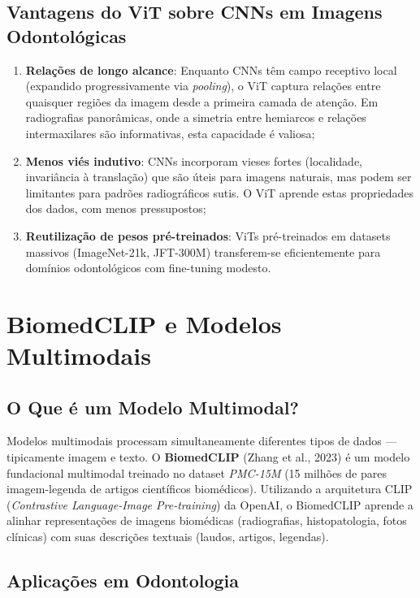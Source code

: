 \subsection{Vantagens do ViT sobre CNNs em Imagens Odontológicas}

\begin{enumerate}
    \item \textbf{Relações de longo alcance}: Enquanto CNNs têm campo receptivo local (expandido progressivamente via \textit{pooling}), o ViT captura relações entre quaisquer regiões da imagem desde a primeira camada de atenção. Em radiografias panorâmicas, onde a simetria entre hemiarcos e relações intermaxilares são informativas, esta capacidade é valiosa;

    \item \textbf{Menos viés indutivo}: CNNs incorporam vieses fortes (localidade, invariância à translação) que são úteis para imagens naturais, mas podem ser limitantes para padrões radiográficos sutis. O ViT aprende estas propriedades dos dados, com menos pressupostos;

    \item \textbf{Reutilização de pesos pré-treinados}: ViTs pré-treinados em datasets massivos (ImageNet-21k, JFT-300M) transferem-se eficientemente para domínios odontológicos com fine-tuning modesto.
\end{enumerate}

\section{BiomedCLIP e Modelos Multimodais}

\subsection{O Que é um Modelo Multimodal?}

Modelos multimodais processam simultaneamente diferentes tipos de dados --- tipicamente imagem e texto. O \textbf{BiomedCLIP} (Zhang et al., 2023) é um modelo fundacional multimodal treinado no dataset \textit{PMC-15M} (15 milhões de pares imagem-legenda de artigos científicos biomédicos). Utilizando a arquitetura CLIP (\textit{Contrastive Language-Image Pre-training}) da OpenAI, o BiomedCLIP aprende a alinhar representações de imagens biomédicas (radiografias, histopatologia, fotos clínicas) com suas descrições textuais (laudos, artigos, legendas).

\subsection{Aplicações em Odontologia}

